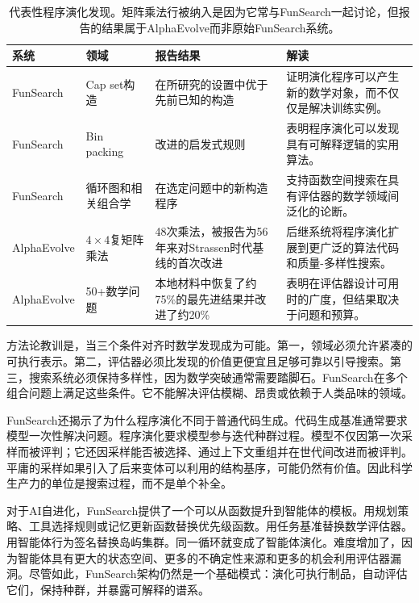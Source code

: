 \begin{table}[t]
\centering
\caption{代表性程序演化发现。矩阵乘法行被纳入是因为它常与FunSearch一起讨论，但报告的结果属于AlphaEvolve而非原始FunSearch系统。}
\label{tab:funsearch-alphaevolve-results}
{\TableTight
\begin{tabularx}{\textwidth}{@{}L{0.16\textwidth}L{0.19\textwidth}L{0.20\textwidth}Y@{}}
\toprule
\textbf{系统} & \textbf{领域} & \textbf{报告结果} & \textbf{解读} \\
\midrule
FunSearch & Cap set构造 & 在所研究的设置中优于先前已知的构造 & 证明演化程序可以产生新的数学对象，而不仅仅是解决训练实例。 \\
FunSearch & Bin packing & 改进的启发式规则 & 表明程序演化可以发现具有可解释逻辑的实用算法。 \\
FunSearch & 循环图和相关组合学 & 在选定问题中的新构造程序 & 支持函数空间搜索在具有评估器的数学领域间泛化的论断。 \\
AlphaEvolve & $4\times4$复矩阵乘法 & 48次乘法，被报告为56年来对Strassen时代基线的首次改进 & 后继系统将程序演化扩展到更广泛的算法代码和质量-多样性搜索。 \\
AlphaEvolve & 50+数学问题 & 本地材料中恢复了约75\%的最先进结果并改进了约20\% & 表明在评估器设计可用时的广度，但结果取决于问题和预算。 \\
\bottomrule
\end{tabularx}}
\end{table}

方法论教训是，当三个条件对齐时数学发现成为可能。第一，领域必须允许紧凑的可执行表示。第二，评估器必须比发现的价值更便宜且足够可靠以引导搜索。第三，搜索系统必须保持多样性，因为数学突破通常需要踏脚石。FunSearch在多个组合问题上满足这些条件。它不能解决评估模糊、昂贵或依赖于人类品味的领域。

FunSearch还揭示了为什么程序演化不同于普通代码生成。代码生成基准通常要求模型一次性解决问题。程序演化要求模型参与迭代种群过程。模型不仅因第一次采样而被评判；它还因采样能否被选择、通过上下文重组并在世代间改进而被评判。平庸的采样如果引入了后来变体可以利用的结构基序，可能仍然有价值。因此科学生产力的单位是搜索过程，而不是单个补全。

对于AI自进化，FunSearch提供了一个可以从函数提升到智能体的模板。用规划策略、工具选择规则或记忆更新函数替换优先级函数。用任务基准替换数学评估器。用智能体行为签名替换岛屿集群。同一循环就变成了智能体演化。难度增加了，因为智能体具有更大的状态空间、更多的不确定性来源和更多的机会利用评估器漏洞。尽管如此，FunSearch架构仍然是一个基础模式：演化可执行制品，自动评估它们，保持种群，并暴露可解释的谱系。

